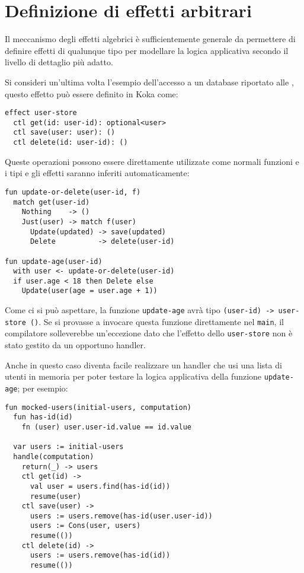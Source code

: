 \section{Definizione di effetti arbitrari}
Il meccanismo degli effetti algebrici è sufficientemente generale da permettere di definire effetti di qualunque tipo per modellare la logica applicativa secondo il livello di dettaglio più adatto.

Si consideri un'ultima volta l'esempio dell'accesso a un database riportato alle , questo effetto può essere definito in Koka come:
\begin{lstlisting}[language=koka]
effect user-store
  ctl get(id: user-id): optional<user>
  ctl save(user: user): ()
  ctl delete(id: user-id): ()
\end{lstlisting}

Queste operazioni possono essere direttamente utilizzate come normali funzioni e i tipi e gli effetti saranno inferiti automaticamente:
\begin{lstlisting}[language=koka]
fun update-or-delete(user-id, f)
  match get(user-id)
    Nothing    -> ()
    Just(user) -> match f(user)  
      Update(updated) -> save(updated)
      Delete          -> delete(user-id)

fun update-age(user-id)
  with user <- update-or-delete(user-id)
  if user.age < 18 then Delete else
    Update(user(age = user.age + 1))
\end{lstlisting}

Come ci si può aspettare, la funzione \lstinline{update-age} avrà tipo \lstinline{(user-id) -> user-store ()}.
Se si provasse a invocare questa funzione direttamente nel \lstinline{main}, il compilatore solleverebbe un'eccezione dato che l'effetto dello \lstinline{user-store} non è stato gestito da un opportuno handler.

Anche in questo caso diventa facile realizzare un handler che usi una lista di utenti in memoria per poter testare la logica applicativa della funzione \lstinline{update-age}; per esempio:
\begin{lstlisting}[language=koka]
fun mocked-users(initial-users, computation)
  fun has-id(id)
    fn (user) user.user-id.value == id.value

  var users := initial-users
  handle(computation)
    return(_) -> users
    ctl get(id) ->
      val user = users.find(has-id(id))
      resume(user)
    ctl save(user) -> 
      users := users.remove(has-id(user.user-id))
      users := Cons(user, users)
      resume(())
    ctl delete(id) ->
      users := users.remove(has-id(id))
      resume(())
\end{lstlisting}

